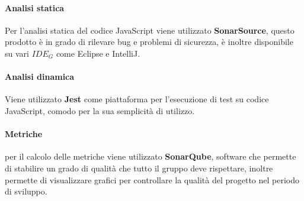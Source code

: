 			\paragraph{Analisi statica}
			Per l'analisi statica del codice JavaScript viene utilizzato \textbf{SonarSource}, questo prodotto è in grado di rilevare bug e problemi di sicurezza, è inoltre disponibile su vari $IDE_G$ come Eclipse e IntelliJ.
			\paragraph{Analisi dinamica}
		    Viene utilizzato \textbf{Jest} come piattaforma per l'esecuzione di test su codice JavaScript, comodo per la sua semplicità di utilizzo.
			\paragraph{Metriche}
			per il calcolo delle metriche viene utilizzato \textbf{SonarQube}, software che permette di stabilire un grado di qualità che tutto il gruppo deve rispettare, inoltre permette di visualizzare grafici per controllare la qualità del progetto nel periodo di sviluppo.
			